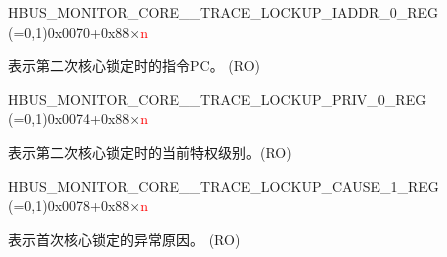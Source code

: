 \begin{register}{H}{BUS\_MONITOR\_CORE\_\_TRACE\_LOCKUP\_IADDR\_0\_REG (=0,1)}{0x0070+0x88×\textcolor{red}{n}}\label{regdesc:BUSMONITORCORE0TRACELOCKUPIADDR0REG}
%
\regnewline%
\begin{regdesc}\begin{reglist}
\label{fielddesc:BUSMONITORCORE0TRACELOCKUPRECORDINGIADDR0}\item [BUS\_MONITOR\_CORE\_\regindex{n}\_TRACE\_LOCKUP\_RECORDING\_IADDR\_0] 表示第二次核心锁定时的指令PC。 (RO)
\end{reglist}\end{regdesc}
\end{register}


\begin{register}{H}{BUS\_MONITOR\_CORE\_\_TRACE\_LOCKUP\_PRIV\_0\_REG (=0,1)}{0x0074+0x88×\textcolor{red}{n}}\label{regdesc:BUSMONITORCORE0TRACELOCKUPPRIV0REG}
%
%
\regnewline%
\begin{regdesc}\begin{reglist}
\label{fielddesc:BUSMONITORCORE0TRACELOCKUPRECORDINGPRIV0}\item [BUS\_MONITOR\_CORE\_\regindex{n}\_TRACE\_LOCKUP\_RECORDING\_PRIV\_0] 表示第二次核心锁定时的当前特权级别。(RO)
\end{reglist}\end{regdesc}
\end{register}


\begin{register}{H}{BUS\_MONITOR\_CORE\_\_TRACE\_LOCKUP\_CAUSE\_1\_REG (=0,1)}{0x0078+0x88×\textcolor{red}{n}}\label{regdesc:BUSMONITORCORE0TRACELOCKUPCAUSE1REG}
%
%
\regnewline%
\begin{regdesc}\begin{reglist}
\label{fielddesc:BUSMONITORCORE0TRACELOCKUPRECORDINGCAUSE1}\item [BUS\_MONITOR\_CORE\_\regindex{n}\_TRACE\_LOCKUP\_RECORDING\_CAUSE\_1] 表示首次核心锁定的异常原因。 (RO)
\end{reglist}\end{regdesc}
\end{register}


